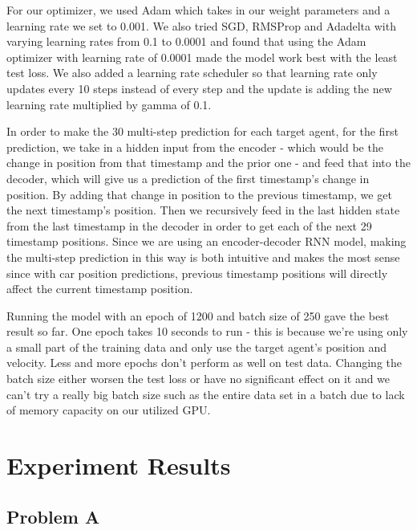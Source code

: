 \documentclass{article}
\begin{document}
For our optimizer, we used Adam which takes in our weight parameters and a learning rate we set to 0.001. We also tried SGD, RMSProp and  Adadelta with varying learning rates from 0.1 to 0.0001 and found that using the Adam optimizer with learning rate of 0.0001 made the model work best with the least test loss. We also added a learning rate scheduler so that learning rate only updates every 10 steps instead of every step and the update is adding the new learning rate multiplied by gamma of 0.1.  

In order to make the 30 multi-step prediction for each target agent, for the first prediction, we take in a hidden input from the encoder - which would be the change in position from that timestamp and the prior one - and feed that into the decoder, which will give us a prediction of the first timestamp's change in position. By adding that change in position to the previous timestamp, we get the next timestamp's position. Then we recursively feed in the last hidden state from the last timestamp in the decoder in order to get each of the next 29 timestamp positions. Since we are using an encoder-decoder RNN model, making the multi-step prediction in this way is both intuitive and makes the most sense since with car position predictions, previous timestamp positions will directly affect the current timestamp position. 

Running the model with an epoch of 1200 and batch size of 250 gave the best result so far. One epoch takes 10 seconds to run - this is because we're using only a small part of the training data and only use the target agent's position and velocity. Less and more epochs don't perform as well on test data. Changing the batch size either worsen the test loss or have no significant effect on it and we can't try a really big batch size such as the entire data set in a batch due to lack of memory capacity on our utilized GPU. 

\section{Experiment Results}
\subsection{Problem A}
\end{document}
